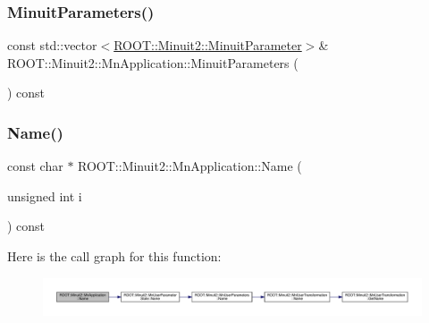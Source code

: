 \subsubsection{\texorpdfstring{MinuitParameters()}{MinuitParameters()}\hspace{0.1cm}{\footnotesize\ttfamily [3/3]}}
{\footnotesize\ttfamily const std\+::vector$<$\mbox{\hyperlink{classROOT_1_1Minuit2_1_1MinuitParameter}{R\+O\+O\+T\+::\+Minuit2\+::\+Minuit\+Parameter}}$>$\& R\+O\+O\+T\+::\+Minuit2\+::\+Mn\+Application\+::\+Minuit\+Parameters (\begin{DoxyParamCaption}{ }\end{DoxyParamCaption}) const}

\mbox{\label{classROOT_1_1Minuit2_1_1MnApplication_ad333315ce51772fef3094491b37f309d}} 
\subsubsection{\texorpdfstring{Name()}{Name()}\hspace{0.1cm}{\footnotesize\ttfamily [1/3]}}
{\footnotesize\ttfamily const char $\ast$ R\+O\+O\+T\+::\+Minuit2\+::\+Mn\+Application\+::\+Name (\begin{DoxyParamCaption}\item[{unsigned int}]{i }\end{DoxyParamCaption}) const}

Here is the call graph for this function\+:
\nopagebreak
\begin{figure}[H]
\begin{center}
\leavevmode
\includegraphics[width=350pt]{df/dd5/classROOT_1_1Minuit2_1_1MnApplication_ad333315ce51772fef3094491b37f309d_cgraph}
\end{center}
\end{figure}
\mbox{\label{classROOT_1_1Minuit2_1_1MnApplication_af970f4c896be2d56b2bfb33a8e6e33c9}} 
